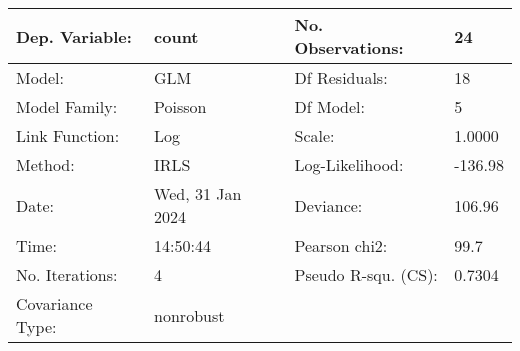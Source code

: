 \begin{tabular}{llll}
\toprule
Dep. Variable: & count &   No. Observations:   &     24 \\
\midrule
Model: & GLM &   Df Residuals:       &     18 \\
Model Family: & Poisson &   Df Model:           &      5 \\
Link Function: & Log &   Scale:              &   1.0000 \\
Method: & IRLS &   Log-Likelihood:     &  -136.98 \\
Date: & Wed, 31 Jan 2024 &   Deviance:           &   106.96 \\
Time: & 14:50:44 &   Pearson chi2:       &   99.7 \\
No. Iterations: & 4 &   Pseudo R-squ. (CS): & 0.7304 \\
Covariance Type: & nonrobust &                       &   \\
\bottomrule
\end{tabular}
